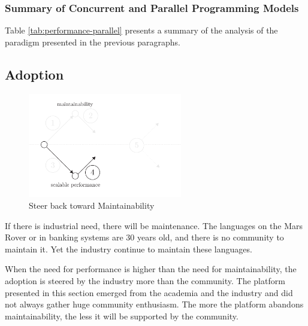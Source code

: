 \subsubsection{Summary of Concurrent and Parallel Programming Models}

Table \ref{tab:performance-parallel} presents a summary of the analysis of the paradigm presented in the previous paragraphs.


\subsection{Adoption} \label{chapter3:software-performance:adoption}

\begin{figure}[!h]
\begin{center}
\includegraphics[width=0.6\textwidth]{../ressources/state-of-the-art-4.pdf}
\end{center}
\caption{Steer back toward Maintainability}
\label{fig:state-of-the-art-4}
\end{figure}


If there is industrial need, there will be maintenance.
The languages on the Mars Rover or in banking systems are 30 years old, and there is no community to maintain it.
Yet the industry continue to maintain these languages.

When the need for performance is higher than the need for maintainability, the adoption is steered by the industry more than the community.
The platform presented in this section emerged from the academia and the industry and did not always gather huge community enthusiasm.
The more the platform abandons maintainability, the less it will be supported by the community.



